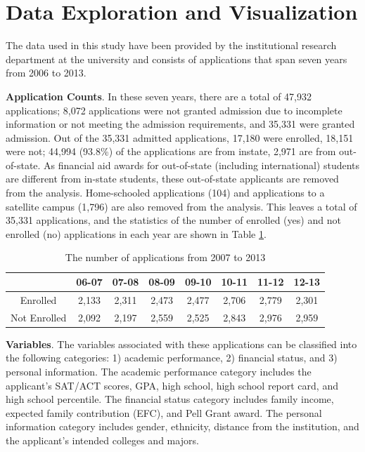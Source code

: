 \documentclass[12pt,english]{report}
\begin{document}
\section{Data Exploration and Visualization}
The data used in this study have been provided by the institutional research department at the  university and consists of  applications that span seven years from 2006 to 2013. 

\noindent \textbf{Application Counts}. In these seven years, there are a total of 47,932 applications; 8,072 applications were not granted admission due to incomplete information or not meeting the admission requirements, and 35,331 were granted admission. Out of the 35,331 admitted applications, 17,180 were enrolled, 18,151 were not; 44,994 (93.8\%) of the applications are from instate, 2,971 are from out-of-state. As financial aid awards for out-of-state (including international) students are different from in-state students, these out-of-state applicants are removed from the analysis. Home-schooled applications (104) and applications to a satellite campus (1,796) are also removed from the analysis. This leaves a total of 35,331 applications, and the statistics of the number of enrolled (yes) and not enrolled (no) applications in each year are shown in Table \ref{enroll_year_sum}.

\begin{table}[H]
\centering
\begin{tabular}{|c|c|c|c|c|c|c|c|} \hline
          & 06-07 & 07-08 & 08-09 & 09-10 & 10-11 & 11-12 & 12-13 \\ \hline
Enrolled  & 2,133  & 2,311  & 2,473  & 2,477  & 2,706  & 2,779  & 2,301  \\ \hline
Not Enrolled   & 2,092  & 2,197  & 2,559  & 2,525  & 2,843  & 2,976  & 2,959\\ \hline
\end{tabular}
\caption{The number of applications from 2007 to 2013}
\label{enroll_year_sum}
\end{table}

\vspace{0.15in}
\noindent \textbf{Variables}. The variables associated with these applications can be classified into the following categories: 1) academic performance, 2) financial status, and 3) personal information. The academic performance category includes the applicant's SAT/ACT  scores, GPA, high school, high school report card, and high school percentile. The  financial status category includes family income, expected family contribution (EFC), and Pell Grant award. The personal information category includes gender,  ethnicity, distance from the institution, and the applicant's intended colleges and majors.
\end{document}
